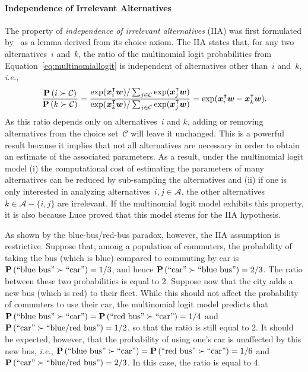 \paragraph{Independence of Irrelevant Alternatives}

The property of \emph{independence of irrelevant alternatives} (IIA) was first formulated by~\citet{luce1959individual} as a lemma derived from its choice axiom.
The IIA states that, for any two alternatives~$i$ and~$k$, the ratio of the multinomial logit probabilities from Equation~\ref{eq:multinomiallogit} is independent of alternatives other than~$i$ and~$k$, \textit{i.e.},
\begin{equation}
  \frac{\mathbf{P}\left( i \succ \mathcal{C} \right)}{\mathbf{P}\left( k \succ \mathcal{C} \right)}
  = \frac{\exp(\bm{x}_i^\intercal \bm{w}) / \sum_{j \in \mathcal{C}} \exp(\bm{x}_j^\intercal \bm{w})}{\exp(\bm{x}_k^\intercal \bm{w}) / \sum_{j \in \mathcal{C}} \exp(\bm{x}_j^\intercal \bm{w})}
  = \exp(\bm{x}_i^\intercal \bm{w} - \bm{x}_k^\intercal \bm{w}).
\end{equation}
As this ratio depends only on alternatives~$i$ and $k$, adding or removing alternatives from the choice set~$\mathcal{C}$ will leave it unchanged.
This is a powerful result because it implies that not all alternatives are necessary in order to obtain an estimate of the associated parameters.
As a result, under the multinomial logit model (i) the computational cost of estimating the parameters of many alternatives can be reduced by sub-sampling the alternatives and (ii) if one is only interested in analyzing alternatives~$i,j \in \mathcal{A}$, the other alternatives~$k \in \mathcal{A} - \{i, j\}$ are irrelevant.
If the multinomial logit model exhibits this property, it is also because Luce proved that this model stems for the IIA hypothesis.

As shown by the blue-bus/red-bus paradox, however, the IIA assumption is restrictive.
Suppose that, among a population of commuters, the probability of taking the bus (which is blue) compared to commuting by car is $\mathbf{P}\left( \text{``blue bus''} \succ \text{``car''} \right) = 1/3$, and hence $\mathbf{P}\left( \text{``car''} \succ \text{``blue bus''} \right) = 2/3$.
The ratio between these two probabilities is equal to 2.
Suppose now that the city adds a new bus (which is red) to their fleet.
While this should not affect the probability of commuters to use their car, the multinomial logit model predicts that $\mathbf{P}\left( \text{``blue bus''} \succ \text{``car''} \right) = \mathbf{P}\left( \text{``red bus''} \succ \text{``car''} \right) = 1/4$ and $\mathbf{P}\left( \text{``car''} \succ \text{``blue/red bus''} \right) = 1/2$, so that the ratio is still equal to 2.
It should be expected, however, that the probability of using one's car is unaffected by this new bus, \textit{i.e.}, $\mathbf{P}\left( \text{``blue bus''} \succ \text{``car''} \right) = \mathbf{P}\left( \text{``red bus''} \succ \text{``car''} \right) = 1/6$ and $\mathbf{P}\left( \text{``car''} \succ \text{``blue/red bus''} \right) = 2/3$.
In this case, the ratio is equal to 4.

